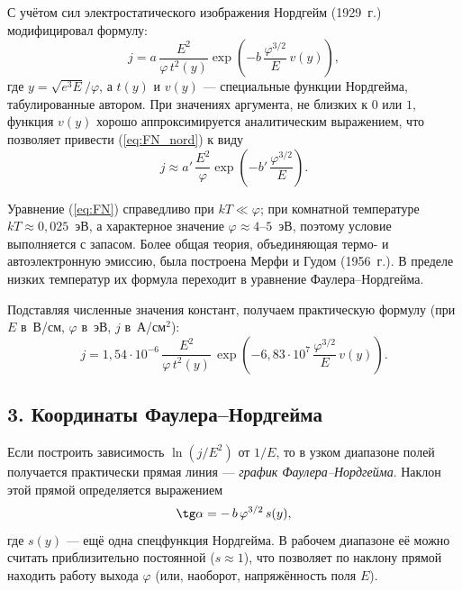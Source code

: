 \documentclass[12pt, a4paper]{article}
\begin{document}
С учётом сил электростатического изображения Нордгейм (1929~г.) модифицировал формулу:
\begin{equation}
    j = a\,\frac{E^{2}}{\varphi\,t^{2}(y)}\exp\!\left(-b\,\frac{\varphi^{3/2}}{E}\,v(y)\right),
    \label{eq:FN_nord}
\end{equation}
где $y = \sqrt{e^{3}E}/\varphi$, а $t(y)$ и $v(y)$ --- специальные функции Нордгейма, табулированные автором. При значениях аргумента, не близких к $0$ или $1$, функция $v(y)$ хорошо аппроксимируется аналитическим выражением, что позволяет привести (\ref{eq:FN_nord}) к виду
\begin{equation}
    j \approx a'\,\frac{E^{2}}{\varphi}\exp\!\left(-b'\,\frac{\varphi^{3/2}}{E}\right).
    \label{eq:FN_approx}
\end{equation}

Уравнение (\ref{eq:FN}) справедливо при $kT \ll \varphi$; при комнатной температуре $kT \approx 0{,}025$~эВ, а характерное значение $\varphi \approx 4$--$5$~эВ, поэтому условие выполняется с запасом. Более общая теория, объединяющая термо- и автоэлектронную эмиссию, была построена Мерфи и Гудом (1956~г.). В пределе низких температур их формула переходит в уравнение Фаулера--Нордгейма.

Подставляя численные значения констант, получаем практическую формулу (при $E$ в~В/см, $\varphi$ в~эВ, $j$ в~А/см$^{2}$):
\begin{equation}
    j = 1{,}54\cdot10^{-6}\,\frac{E^{2}}{\varphi\,t^{2}(y)}\,
    \exp\!\left(-6{,}83\cdot10^{7}\,\frac{\varphi^{3/2}}{E}\,v(y)\right).
    \label{eq:FN_num}
\end{equation}

\subsection*{3. Координаты Фаулера--Нордгейма}

Если построить зависимость $\ln(j/E^{2})$ от $1/E$, то в узком диапазоне полей получается практически прямая линия --- \textit{график Фаулера--Нордгейма}. Наклон этой прямой определяется выражением
\begin{equation}
    \tg\alpha = -\,b\,\varphi^{3/2}\,s(y),
    \label{eq:slope}
\end{equation}
где $s(y)$ --- ещё одна спецфункция Нордгейма. В рабочем диапазоне её можно считать приблизительно постоянной ($s \approx 1$), что позволяет по наклону прямой находить работу выхода $\varphi$ (или, наоборот, напряжённость поля $E$).
\end{document}
